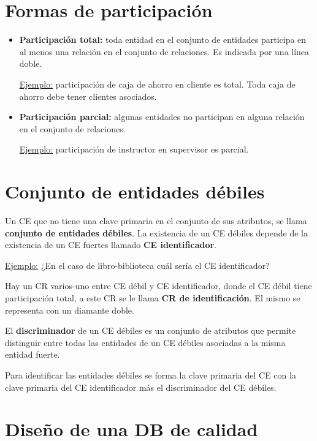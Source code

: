 \documentclass[12pt,a4paper]{report}
\begin{document}
	\section{Formas de participación}
		\begin{itemize}
			\item \textbf{Participación total:} toda entidad en el conjunto de entidades participa en al menos una relación en el conjunto de relaciones. Es indicada por una línea doble.
			\par \underline{Ejemplo:} participación de caja de ahorro en cliente es total. Toda caja de ahorro debe tener clientes asociados.
			\item \textbf{Participación parcial:} algunas entidades no participan en alguna relación en el conjunto de relaciones.
			\par \underline{Ejemplo:} participación de instructor en supervisor es parcial.
		\end{itemize}
		
	\section{Conjunto de entidades débiles}
		Un CE que no tiene una clave primaria en el conjunto de sus atributos, se llama \textbf{conjunto de entidades débiles}. La existencia de un CE débiles depende de la existencia de un CE fuertes llamado \textbf{CE identificador}. 
		\vspace{5mm}
		\par \underline{Ejemplo:} ¿En el caso de libro-biblioteca cuál sería el CE identificador?
		\vspace{2.5mm}
		\par Hay un CR varios-uno entre CE débil y CE identificador, donde el CE débil tiene participación total, a este CR se le llama \textbf{CR de identificación}. El mismo se representa con un diamante doble.
		\par El \textbf{discriminador} de un CE débiles es un conjunto de atributos que permite distinguir entre todas las entidades de un CE débiles asociadas a la misma entidad fuerte. 
		\par Para identificar las entidades débiles se forma la clave primaria del CE con la clave primaria del CE identificador más el discriminador del CE débiles.
		
	\section{Diseño de una DB de calidad}
\end{document}
